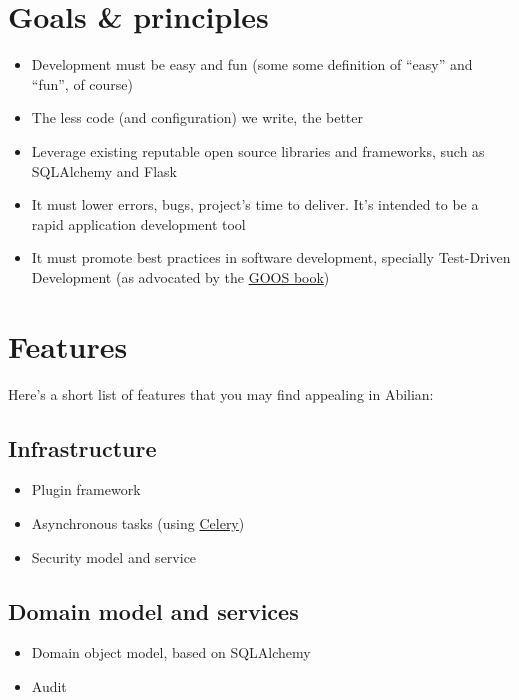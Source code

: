 \documentclass[a4paper,12pt,english]{sphinxmanual}
\begin{document}
\section{Goals \& principles}
\label{introduction:goals-principles}\begin{itemize}
\item {} 
Development must be easy and fun (some some definition of ``easy'' and ``fun'', of course)

\item {} 
The less code (and configuration) we write, the better

\item {} 
Leverage existing reputable open source libraries and frameworks, such as SQLAlchemy and Flask

\item {} 
It must lower errors, bugs, project's time to deliver. It's intended to be a rapid application development tool

\item {} 
It must promote best practices in software development, specially Test-Driven Development (as advocated by the \href{http://www.amazon.com/gp/product/0321503627/ref=as\_li\_qf\_sp\_asin\_tl?ie=UTF8\&camp=1789\&creative=9325\&creativeASIN=0321503627\&linkCode=as2\&tag=fermigiercom-20}{GOOS book})

\end{itemize}


\section{Features}
\label{introduction:features}
Here's a short list of features that you may find appealing in Abilian:


\subsection{Infrastructure}
\label{introduction:infrastructure}\begin{itemize}
\item {} 
Plugin framework

\item {} 
Asynchronous tasks (using \href{http://www.celeryproject.org/}{Celery})

\item {} 
Security model and service

\end{itemize}


\subsection{Domain model and services}
\label{introduction:domain-model-and-services}\begin{itemize}
\item {} 
Domain object model, based on SQLAlchemy

\item {} 
Audit

\end{itemize}
\end{document}
